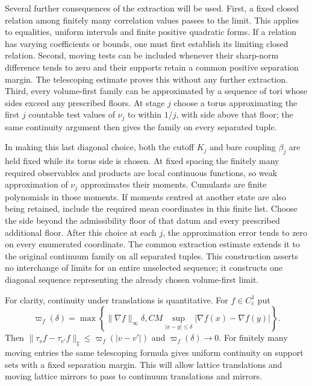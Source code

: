 \documentclass[11pt,letterpaper,reqno]{amsart}
\theoremstyle{definition}
\theoremstyle{remark}
\begin{document}
Several further consequences of the extraction will be used. First,
a fixed closed relation among finitely many correlation values passes
to the limit. This applies to equalities, uniform intervals and finite
positive quadratic forms. If a relation has varying coefficients or
bounds, one must first establish its limiting closed relation. Second,
moving tests can be included whenever their sharp-norm difference tends
to zero and their supports retain a common positive separation margin.
The telescoping estimate proves this without any further extraction.
Third, every volume-first family can be approximated by a sequence of
tori whose sides exceed any prescribed floors. At stage $j$ choose a
torus approximating the first $j$ countable test values of $\nu_j$ to
within $1/j$, with side above that floor; the same continuity argument
then gives the family on every separated tuple.

In making this last diagonal choice, both the cutoff $K_j$ and bare
coupling $\beta_j$ are held fixed while its torus side is chosen.
At fixed spacing the finitely many required observables and products
are local continuous functions, so weak approximation of $\nu_j$
approximates their moments. Cumulants are finite polynomials in those
moments. If moments centred at another state are also being retained,
include the required mean coordinates in this finite list. Choose
the side beyond the admissibility floor of that datum and every
prescribed additional floor. After this choice at each $j$, the
approximation error tends to zero on every enumerated coordinate.
The common extraction estimate extends it to the original continuum
family on all separated tuples. This construction asserts no
interchange of limits for an entire unselected sequence; it constructs
one diagonal sequence representing the already chosen volume-first
limit.

For clarity, continuity under translations is quantitative. For
$f\in C_c^1$ put
\[
 \varpi_f(\delta)=\max\left\{
        \|\nabla f\|_\infty\delta,
        CM\sup_{|x-y|\le\delta}|\nabla f(x)-\nabla f(y)|\right\}.
\]
Then $\|\tau_vf-\tau_{v'}f\|_\sharp\le\varpi_f(|v-v'|)$
and $\varpi_f(\delta)\to0$. For finitely many moving entries the
same telescoping formula gives uniform continuity on support sets with
a fixed separation margin. This will allow lattice translations and
moving lattice mirrors to pass to continuum translations and mirrors.
\end{document}
